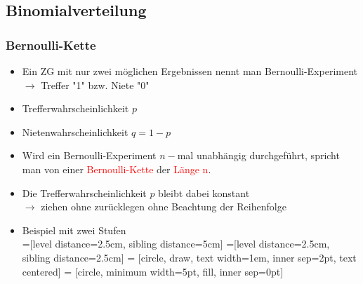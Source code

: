 \documentclass[a4paper,twocolumn,10pt]{onepgnote1}
\begin{document}
\subsection{Binomialverteilung}
\subsubsection{Bernoulli-Kette}
\begin{itemize}
    \item Ein ZG mit nur zwei möglichen Ergebnissen nennt man Bernoulli-Experiment $ \longrightarrow$ Treffer "1" bzw. Niete "0"
    \item Trefferwahrscheinlichkeit $p$
    \item Nietenwahrscheinlichkeit $q = 1-p$
    \item Wird ein Bernoulli-Experiment $n-$mal unabhängig durchgeführt, spricht man von einer \textcolor{red}{Bernoulli-Kette} der \textcolor{red}{Länge n}. 
    \item Die Trefferwahrscheinlichkeit $p$ bleibt dabei konstant \\$\longrightarrow$ ziehen ohne zurücklegen ohne Beachtung der Reihenfolge
    \item Beispiel mit zwei Stufen\\
=[level distance=2.5cm, sibling distance=5cm]
=[level distance=2.5cm, sibling distance=2.5cm]
 = [circle, draw, text width=1em, inner sep=2pt, text centered]
 = [circle, minimum width=5pt, fill, inner sep=0pt]
\end{itemize}
\end{document}
